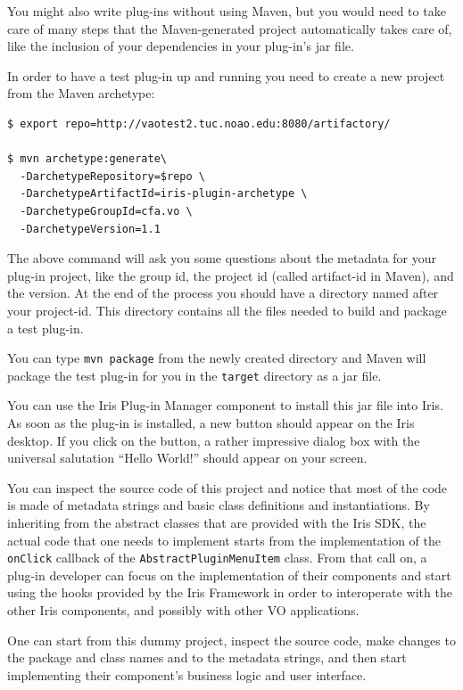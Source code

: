 \documentclass[preprint,authoryear,5p]{elsarticle}
\begin{document}
You might also write plug-ins without using Maven, but you would need to take
care of many steps that the Maven-generated project automatically takes care of,
like the inclusion of your dependencies in your plug-in's jar file.

In order to have a test plug-in up and running you need to create a new project
from the Maven archetype:

\begin{lstlisting}[style=code]
$ export repo=http://vaotest2.tuc.noao.edu:8080/artifactory/

$ mvn archetype:generate\
  -DarchetypeRepository=$repo \
  -DarchetypeArtifactId=iris-plugin-archetype \
  -DarchetypeGroupId=cfa.vo \
  -DarchetypeVersion=1.1
\end{lstlisting}

The above command will ask you some questions about the metadata for your
plug-in project, like the group id, the project id (called artifact-id in
Maven), and the version. At the end of the process you should have a directory
named after your project-id. This directory contains all the files needed to
build and package a test plug-in.

You can type \verb|mvn package| from the newly created directory and Maven will
package the test plug-in for you in the \verb|target| directory as a jar file.

You can use the Iris Plug-in Manager component to install this jar file into
Iris. As soon as the plug-in is installed, a new button should appear on the Iris desktop. If
you click on the button, a rather impressive dialog box with the universal salutation
``Hello World!'' should appear on your screen.

You can inspect the source code of this project and notice that most of the code is
made of metadata strings and basic class definitions and instantiations. By
inheriting from the abstract classes that are provided with the Iris SDK, the
actual code that one needs to implement starts from the implementation of the
\verb|onClick| callback of the \verb|AbstractPluginMenuItem| class. From that call on,
a plug-in developer can focus on the implementation of their components and
start using the hooks provided by the Iris Framework in order to interoperate
with the other Iris components, and possibly with other VO applications.

One can start from this dummy project, inspect the source code, make changes to
the package and class names and to the metadata strings, and then start
implementing their component's business logic and user interface.
\end{document}
